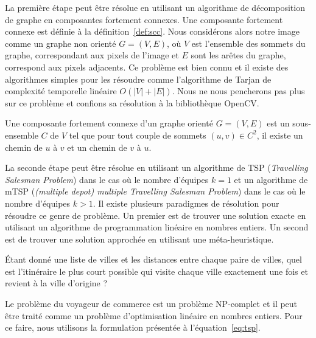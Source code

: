 \documentclass[francais,RandD]{rapportPFE}
\begin{document}
				La première étape peut être résolue en utilisant un algorithme de décomposition de graphe en composantes fortement connexes.
				Une composante fortement connexe est définie à la définition~\ref{def:scc}.
				Nous considérons alors notre image comme un graphe non orienté $G = (V, E)$, où  $V$ est l'ensemble des sommets du graphe, correspondant aux pixels de l'image et $E$ sont les arêtes du graphe, correspond aux pixels adjacents.
				Ce problème est bien connu et il existe des algorithmes simples pour les résoudre comme l'algorithme de Tarjan de complexité temporelle linéaire $O(|V| + |E|)$.
				Nous ne nous pencherons pas plus sur ce problème et confions sa résolution à la bibliothèque OpenCV.

				\begin{Definition}
					\label{def:scc}
					Une composante fortement connexe d'un graphe orienté $G = (V, E)$ est un sous-ensemble $C$ de $V$ tel que pour tout couple de sommets $(u, v) \in C^2$, il existe un chemin de $u$ à $v$ et un chemin de $v$ à $u$.
				\end{Definition}

				La seconde étape peut être résolue en utilisant un algorithme de TSP (\textit{Travelling Salesman Problem}) dans le cas où le nombre d'équipes $k = 1$ et un algorithme de mTSP (\textit{(multiple depot) multiple Travelling Salesman Problem}) dans le cas où le nombre d'équipes $k > 1$.
				Il existe plusieurs paradigmes de résolution pour résoudre ce genre de problème.
				Un premier est de trouver une solution exacte en utilisant un algorithme de programmation linéaire en nombres entiers.
				Un second est de trouver une solution approchée en utilisant une méta-heuristique.

				\begin{Definition}
					\label{def:tsp}
					Étant donné une liste de villes et les distances entre chaque paire de villes, quel est l'itinéraire le plus court possible qui visite chaque ville exactement une fois et revient à la ville d'origine ?
				\end{Definition}

				Le problème du voyageur de commerce est un problème NP-complet et il peut être traité comme un problème d'optimisation linéaire en nombres entiers.
				Pour ce faire, nous utilisons la formulation présentée à l'équation~\ref{eq:tsp}.
\end{document}
